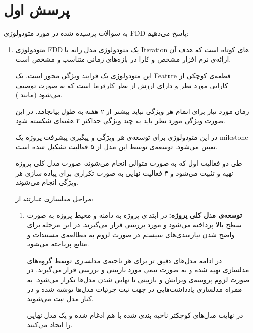 
\section{پرسش اول}
به سوالات پرسیده شده در مورد متودولوژی FDD
پاسخ می‌دهیم:
\begin{enumerate}[i]
\item 
متودولوژی FDD یک متودولوژی مدل رانه
با Iteration های کوتاه است که هدف آن ارائه‌ی نرم افزار مشخص و کارا در بازه‌های زمانی متناسب و مشخص است.

این متودولوژی یک فرایند ویژگی 
محور است. یک Feature قطعه‌ی کوچکی از کارایی مورد نظر و دارای ارزش از نظر کارفرما است که به صورت 
توصیف می‌شود (مانند ).

زمان مورد نیاز برای اتمام هر ویژگی نباید بیشتر از ۲ هفته به طول بیانجامد. در این صورت ویژگی مورد نظر باید به چند ویژگی حداکثر ۲ هفته‌ای شکسته شود.

در این متودولوژی برای توسعه‌ی هر ویژگی و پیگیری پیشرفت پروژه یک milestone تعیین می‌شود. توسعه‌ی توسط این مدل از ۵ فعالیت تشکیل شده است. 

طی دو فعالیت اول که به صورت متوالی انجام می‌شوند، صورت مدل کلی پروژه تهیه و تثبیت می‌شود و ۳ فعالیت نهایی به صورت تکراری برای پیاده سازی هر ویژگی انجام می‌شوند.

مراحل مدلسازی عبارتند از:
\begin{enumerate}
\item 
\textbf{توسعه‌ی مدل کلی پروژه:} \newline
در ابتدای پروژه به دامنه و محیط پروژه به صورت سطح بالا پرداخته می‌شود و مورد بررسی قرار می‌گیرند. در این مرحله برای واضح شدن نیازمندی‌های سیستم در صورت لزوم به مطالعه‌ی مستندات و منابع پرداخته می‌شود.

در ادامه مدل‌های دقیق تر برای هر ناحیه‌ی مدلسازی توسط گروه‌های مدلسازی تهیه شده و به صورت تیمی مورد بازبینی و بررسی قرار می‌گیرند. در صورت لزوم پروسه‌ی ویرایش و بازبینی تا نهایی شدن مدل‌ها تکرار می‌شود. به همراه مدلسازی یادداشت‌هایی در جهت ثبت جزئیات مدل‌ها نوشته شده و در کنار مدل ثبت می‌شوند.


در نهایت مدل‌های کوچکتر ناحیه بندی شده با هم ادغام شده و یک مدل نهایی را ایجاد می‌کنند.


\end{enumerate}
\end{enumerate}
